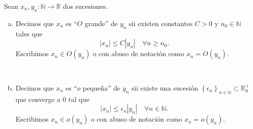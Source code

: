 \documentclass[
	spanish,
	8pt,
	utf8,
	xcolor=table,
	handout,
	aspectratio=169,
	professionalfonts,
	mathserif,
	leqno,
]{beamer}
\begin{document}
\begin{frame}
	\begin{definition}
		Sean $x_{n},y_{n}\colon\mathbb{N}\to\mathbb{R}$ dos sucesiones.

		\begin{enumerate}[a)]
			\item

			      Decimos que $x_{n}$ es ``\alert{$O$ grande}'' de $y_{n}$
			      sii existen constantes $C>0$ y $n_{0}\in\mathbb{N}$
			      tales que
			      \begin{equation*}
				      \left|
				      x_{n}
				      \right|\leq
				      C
				      \left|
				      y_{n}
				      \right|\quad
				      \forall n\geq n_{0}.
			      \end{equation*}
			      Escribimos
			      \begin{math}
				      x_{n}\in
				      O\left(y_{n}\right)
			      \end{math}
			      o con abuso de notación como
			      \begin{math}
				      x_{n}=
				      O\left(y_{n}\right)
			      \end{math}.

			      \

			\item

			      Decimos que $x_{n}$ es ``\alert{$o$ pequeña}'' de $y_{n}$
			      sii existe una sucesión
			      \begin{math}
				      \left\{\epsilon_{n}\right\}_{n\in\mathbb{N}}\subset
				      \mathbb{R}^{+}_{0}
			      \end{math}
			      que converge a $0$ tal que
			      \begin{equation*}
				      \left|
				      x_{n}
				      \right|\leq
				      \epsilon_{n}
				      \left|
				      y_{n}
				      \right|\quad
				      \forall n\in\mathbb{N}.
			      \end{equation*}
			      Escribimos
			      \begin{math}
				      x_{n}\in
				      o\left(y_{n}\right)
			      \end{math}
			      o con abuso de notación como
			      \begin{math}
				      x_{n}=
				      o\left(y_{n}\right)
			      \end{math}.
		\end{enumerate}
	\end{definition}


\end{frame}
\end{document}
